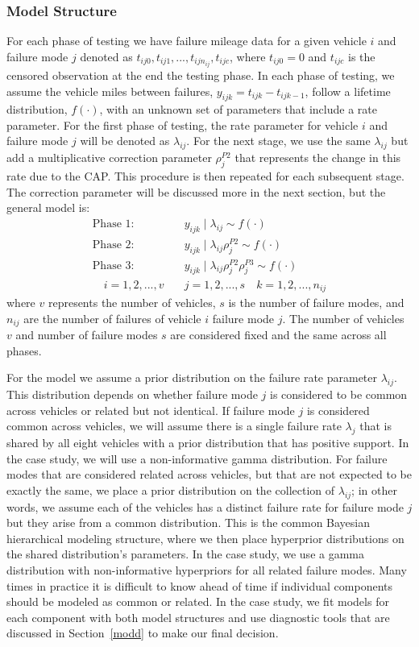 \documentclass[12pt]{article}
\begin{document}
\subsubsection{Model Structure}
For each phase of testing we have failure mileage data for
a given vehicle $i$ and failure mode $j$ denoted as $t_{ij0}, t_{ij1},...,
t_{ijn_{ij}}, t_{ijc}$, where $t_{ij0} = 0$ and $t_{ijc}$ is the censored
observation at the end the testing phase. In each phase of testing, we assume
the vehicle miles between failures, $y_{ijk} = t_{ijk} - t_{ijk-1}$, follow a
lifetime distribution, $f(\cdot)$, with an unknown set of parameters that include
a rate parameter.  For the first phase of testing, the rate parameter for vehicle $i$ and
failure mode $j$ will be denoted as $\lambda_{ij}$.  For the next stage, we use the same $\lambda_{ij}$ but add a multiplicative correction parameter
$\rho_{j}^{P2}$ that represents the change in this rate due to the CAP.  This
procedure is then repeated for each subsequent stage.  The correction parameter
will be discussed more in the next section, but the general model is:
\begin{align*}
\text{Phase 1: }&y_{ijk}\mid\lambda_{ij}\sim f(\cdot) \\
\text{Phase 2: }&y_{ijk}\mid\lambda_{ij}\rho_{j}^{P2}\sim f(\cdot) \\
\text{Phase 3: }&y_{ijk}\mid\lambda_{ij}\rho_{j}^{P2}\rho_{j}^{P3}\sim f(\cdot) \\
\quad i = 1,2,...,v \quad &j=1,2,...,s \quad k=1,2,...,n_{ij}
\end{align*}
where $v$ represents the number of vehicles, $s$ is the number of failure modes,
and $n_{ij}$ are the number of failures of vehicle $i$ failure mode $j$.  The number of vehicles $v$ and number of failure modes $s$ are considered fixed and the same across all phases.

For the model we assume a prior distribution on the failure rate parameter
$\lambda_{ij}$.  This distribution depends on whether failure mode $j$ is
considered to be common across vehicles or related but not identical.  If
failure mode $j$ is considered common across vehicles, we will assume there is a
single failure rate $\lambda_j$ that is shared by all eight vehicles with a
prior distribution that has positive support.  In the case study, we will use a
non-informative gamma distribution.  For failure modes that are considered
related across vehicles, but that are not expected to be exactly the same, we place a
prior distribution on the collection of $\lambda_{ij}$; in other words, we
assume each of the vehicles has a distinct failure rate for failure mode $j$ but
they arise from a common distribution.  This is the common Bayesian hierarchical
modeling structure, where we then place  hyperprior distributions on the shared
distribution's parameters.  In the case study, we use a gamma distribution with
non-informative hyperpriors for all related failure modes.  Many times in
practice  it is difficult to know ahead of time if individual components should
be modeled  as common or related.  In the case study, we fit models for each
component with both model structures and use diagnostic tools  that are
discussed in Section~\ref{modd} to make our final decision.
\end{document}
